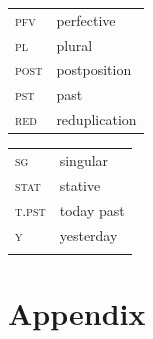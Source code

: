 \documentclass[output=paper,newtxmath,modfonts,nonflat,draftmode]{langsci/langscibook}
\begin{document}
\begin{tabularx}{.45\textwidth}{ll}
\textsc{pfv} &   perfective\\
\textsc{pl} &   plural\\
\textsc{post} &   postposition\\
\textsc{pst}   &   past\\
\textsc{red} &   reduplication\\
\end{tabularx}
\begin{tabularx}{.45\textwidth}{ll}
\textsc{sg} &   singular\\
\textsc{stat} &   stative\\
\textsc{t.pst} &   today past\\
\textsc{y} &   yesterday\\
\\
\end{tabularx}



\section*{Appendix}
\end{document}
